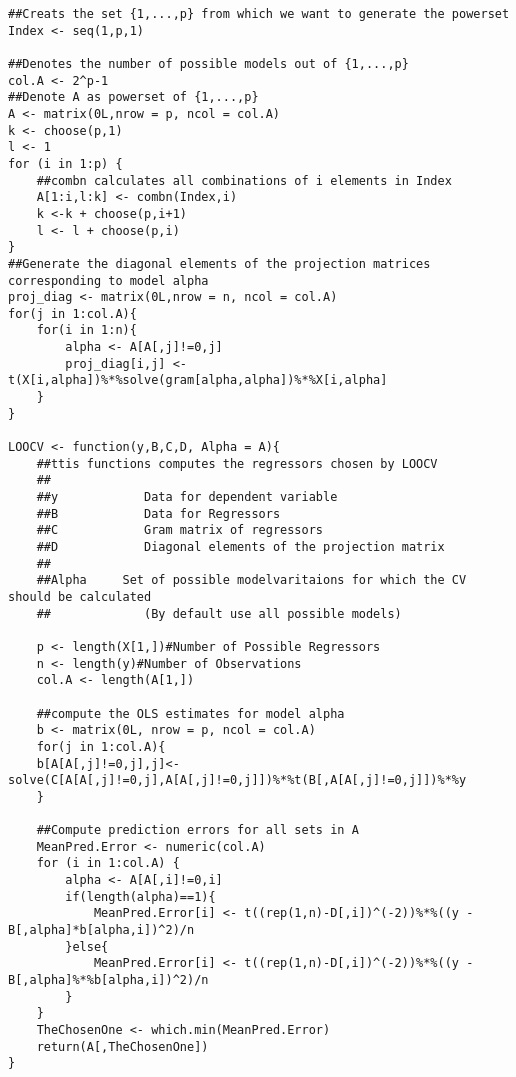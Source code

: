 \documentclass[Research_Module_ES.tex]{subfiles}
\begin{document}
\begin{lstlisting}[title={Leave-one-Out Cross-Validation Function}]
##Creats the set {1,...,p} from which we want to generate the powerset
Index <- seq(1,p,1)    

##Denotes the number of possible models out of {1,...,p}
col.A <- 2^p-1
##Denote A as powerset of {1,...,p}
A <- matrix(0L,nrow = p, ncol = col.A)      
k <- choose(p,1)
l <- 1
for (i in 1:p) {
	##combn calculates all combinations of i elements in Index 
	A[1:i,l:k] <- combn(Index,i)             
	k <-k + choose(p,i+1)
	l <- l + choose(p,i)
}
##Generate the diagonal elements of the projection matrices corresponding to model alpha
proj_diag <- matrix(0L,nrow = n, ncol = col.A)
for(j in 1:col.A){
	for(i in 1:n){
		alpha <- A[A[,j]!=0,j]
		proj_diag[i,j] <- t(X[i,alpha])%*%solve(gram[alpha,alpha])%*%X[i,alpha]
	}
}

LOOCV <- function(y,B,C,D, Alpha = A){
	##ttis functions computes the regressors chosen by LOOCV
	##
	##y            Data for dependent variable
	##B            Data for Regressors
	##C            Gram matrix of regressors
	##D            Diagonal elements of the projection matrix
	##
	##Alpha     Set of possible modelvaritaions for which the CV should be calculated 
	##             (By default use all possible models)  

	p <- length(X[1,])#Number of Possible Regressors
	n <- length(y)#Number of Observations
	col.A <- length(A[1,])

	##compute the OLS estimates for model alpha
	b <- matrix(0L, nrow = p, ncol = col.A)
	for(j in 1:col.A){
	b[A[A[,j]!=0,j],j]<- solve(C[A[A[,j]!=0,j],A[A[,j]!=0,j]])%*%t(B[,A[A[,j]!=0,j]])%*%y
	}

	##Compute prediction errors for all sets in A
	MeanPred.Error <- numeric(col.A)
	for (i in 1:col.A) {
		alpha <- A[A[,i]!=0,i]
		if(length(alpha)==1){
			MeanPred.Error[i] <- t((rep(1,n)-D[,i])^(-2))%*%((y - B[,alpha]*b[alpha,i])^2)/n
		}else{
			MeanPred.Error[i] <- t((rep(1,n)-D[,i])^(-2))%*%((y - B[,alpha]%*%b[alpha,i])^2)/n 
		}
	}
	TheChosenOne <- which.min(MeanPred.Error)
	return(A[,TheChosenOne])
}
\end{lstlisting}
\end{document}
